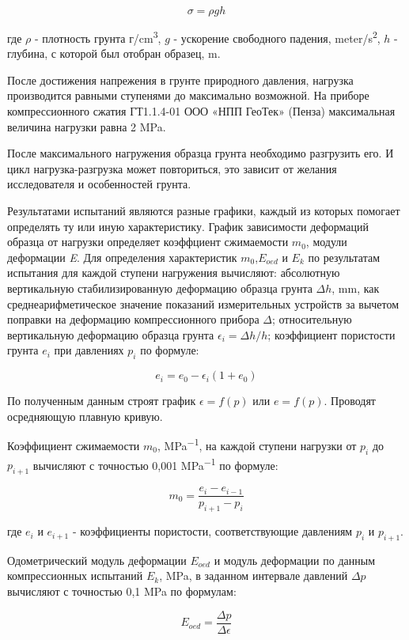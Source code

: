\[
   \sigma = \rho g h
\]

где $\rho$ - плотность грунта г/\si{\centi\meter^3},
$g$ - ускорение свободного падения, \si{meter}/\si{\second^2},
$h$ - глубина, с которой был отобран образец, \si{\meter}.

После достижения напрежения в грунте природного давления, нагрузка 
производится равными ступенями до максимально возможной. На приборе 
компрессионного сжатия ГТ1.1.4-01 ООО «НПП ГеоТек» (Пенза) максимальная 
величина нагрузки равна 2 \si{\mega\pascal}.

После максимального нагружения образца грунта необходимо разгрузить
его. И цикл нагрузка-разгрузка может повториться, это зависит от 
желания исследователя и особенностей грунта.

Результатами испытаний являются разные графики, каждый из которых 
помогает определять ту или иную характеристику. 
График зависимости деформаций образца от нагрузки 
определяет коэффциент сжимаемости \textit{$m_0$}, 
модули деформации \textit{E}.
Для определения характеристик \textit{$m_0$},\textit{$E_{oed}$} и \textit{$E_k$} 
по результатам
испытания для каждой ступени нагружения вычисляют:
абсолютную вертикальную стабилизированную деформацию образца
грунта $\Delta h$, \si{\milli\meter}, как среднеарифметическое значение показаний
измерительных устройств за вычетом поправки на деформацию
компрессионного прибора $\Delta$; относительную вертикальную деформацию образца грунта \(\epsilon_i = \Delta h/h\);
коэффициент пористости грунта $e_i$ при давлениях $p_i$ по формуле:

\[
   e_i = e_0 - \epsilon_i(1+e_0)
\]

По полученным данным строят график \(\epsilon = f(p)\) или
\(e = f(p)\). Проводят осредняющую плавную кривую.

Коэффициент сжимаемости \textit{$m_0$}, \si{\mega\pascal^{-1}}, на каждой ступени нагрузки
от $p_i$ до $p_{i+1}$ вычисляют с точностью 0,001 \si{\mega\pascal^{-1}} по формуле:

\[
   m_0 = \frac{e_i - e_{i-1}}{p_{i+1} - p_i}
\]

где $e_i$ и $e_{i+1}$ - коэффициенты пористости, соответствующие давлениям $p_i$ и $p_{i+1}$.

Одометрический модуль деформации $E_{oed}$ и модуль деформации
по данным компрессионных испытаний $E_k$, \si{\mega\pascal}, в заданном интервале
давлений $\Delta p$ вычисляют с точностью 0,1 \si{\mega\pascal} по формулам:

\[
   E_{oed} = \frac{\Delta p}{\Delta \epsilon}
\]

